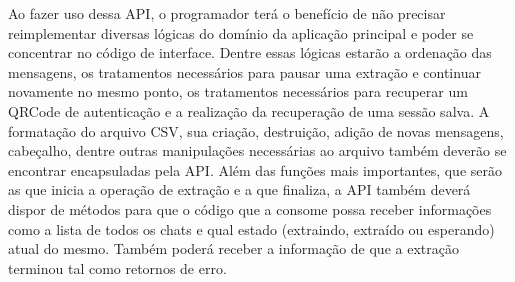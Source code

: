 Ao fazer uso dessa API, o programador terá o benefício de não precisar reimplementar diversas lógicas do domínio da aplicação principal e poder se concentrar no código de interface. Dentre essas lógicas estarão a ordenação das mensagens, os tratamentos necessários para pausar uma extração e continuar novamente no mesmo ponto, os tratamentos necessários para recuperar um QRCode de autenticação e a realização da recuperação de uma sessão salva. A formatação do arquivo CSV, sua criação, destruição, adição de novas mensagens, cabeçalho, dentre outras manipulações necessárias ao arquivo também deverão se encontrar encapsuladas pela API. Além das funções mais importantes, que serão as que inicia a operação de extração e a que finaliza, a API também deverá dispor de métodos para que o código que a consome possa receber informações como a lista de todos os chats e qual estado (extraindo, extraído ou esperando) atual do mesmo. Também poderá receber a informação de que a extração terminou tal como retornos de erro.





